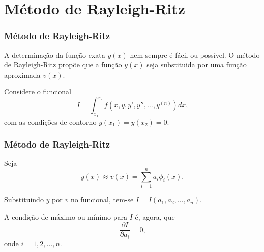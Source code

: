\documentclass{beamer}
\newtheorem{lema}{Lema}
\begin{document}

	
	
	\section{Método de Rayleigh-Ritz}
	
	\begin{frame}
		\frametitle{Método de Rayleigh-Ritz}
		\justify
		
		A determinação da função exata $y(x)$ nem sempre é fácil ou possível. O método de Rayleigh-Ritz propõe que a função $y(x)$ seja substituida por uma função aproximada $v(x)$.
		\vspace{10pt}
		\pause
		
		Considere o funcional
		$$
			I = \int_{x_1}^{x_2} f(x, y, y', y'', \dots, y^{(n)})dx\text{,}
		$$
		com as condições de contorno $y(x_1)=y(x_2)=0$.
	\end{frame}
	
	\begin{frame}
		\frametitle{Método de Rayleigh-Ritz}
		\justify
		
		Seja
		$$
			y(x) \approx v(x)=\sum_{i=1}^n a_i \phi_i(x)
			\text{.}
		$$
		\vspace{10pt}
		\pause
		
		Substituindo $y$ por $v$ no funcional, tem-se $I=I(a_1, a_2, \dots, a_n)$.
		\vspace{10pt}
		\pause
		
		A condição de máximo ou mínimo para $I$ é, agora, que
		$$
			\frac{\partial I}{\partial a_i} = 0
			\text{,}
		$$
		onde $i=1,2,\dots,n$.
	\end{frame}
	
\end{document}
